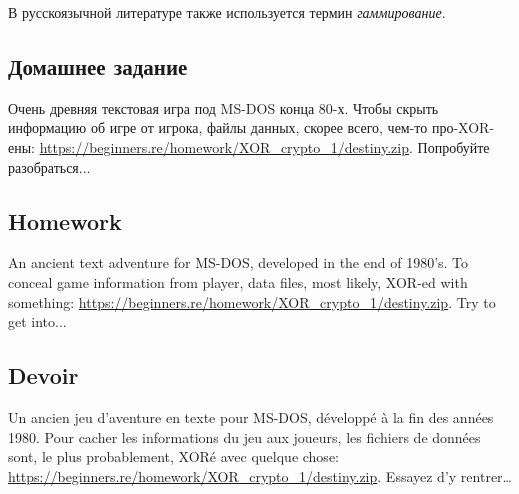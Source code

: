 ﻿
\label{simple_XOR_encryption}

\ifdefined\RUSSIAN
В русскоязычной литературе также используется термин \emph{гаммирование}.
\fi

\EN{}
\FR{}
\DE{}
\RU{}

\EN{}
\RU{}
\FR{}

\EN{}
\RU{}
\FR{}

\EN{}
\RU{}
\FR{}

\EN{}
\RU{}
\FR{}

\ifdefined\RUSSIAN
\subsection{Домашнее задание}

Очень древняя текстовая игра под MS-DOS конца 80-х.
Чтобы скрыть информацию об игре от игрока, файлы данных, скорее всего, чем-то про-XOR-ены:
\url{https://beginners.re/homework/XOR_crypto_1/destiny.zip}.
Попробуйте разобраться...
\fi

\ifdefined\ENGLISH
\subsection{Homework}

An ancient text adventure for MS-DOS, developed in the end of 1980's.
To conceal game information from player, data files, most likely, XOR-ed with something:
\url{https://beginners.re/homework/XOR_crypto_1/destiny.zip}.
Try to get into...
\fi

\ifdefined\FRENCH
\subsection{Devoir}

Un ancien jeu d'aventure en texte pour MS-DOS, développé à la fin des années 1980.
Pour cacher les informations du jeu aux joueurs, les fichiers de données sont,
le plus probablement, XORé avec quelque chose:
\url{https://beginners.re/homework/XOR_crypto_1/destiny.zip}.
Essayez d'y rentrer\dots
\fi

